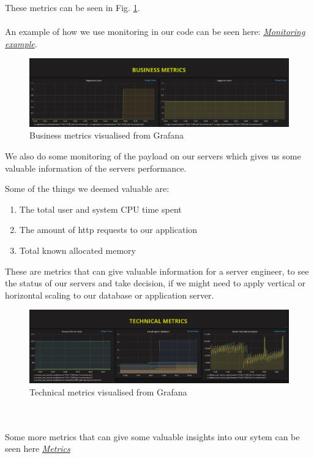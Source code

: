 \documentclass[10pt]{article}
\begin{document}
These metrics can be seen in Fig. \ref{fig:monitoring}. 
\\
\\
An example of how we use monitoring in our code can be seen here: \href{https://github.com/Arklaide/devopsITUproject/blob/main/MinitweetApi/Controllers/UsersController.cs}{\textit{Monitoring example}}.


\begin{figure}[h]
    \centering
    \includegraphics[width=\textwidth]{images/monitoringbusiness.PNG}
    \caption{Business metrics visualised from Grafana}
    \label{fig:monitoring}
\end{figure}
  
We also do some monitoring of the payload on our servers which gives us some valuable information of the servers performance.

Some of the things we deemed valuable are:
\begin{enumerate}
    \item The total user and system CPU time spent
    \item The amount of http requests to our application
    \item Total known allocated memory
\end{enumerate}

These are metrics that can give valuable information for a server engineer, to see the status of our servers and take decision, if we might need to apply vertical or horizontal scaling to our database or application server.

\begin{figure}[h]
    \centering
    \includegraphics[width=\textwidth]{images/monitoring technical.PNG}
    \caption{Technical metrics visualised from Grafana}
    \label{fig:monitoringtechnical}
\end{figure}
\\
\\
Some more metrics that can give some valuable insights into our sytem can be seen here \href{https://github.com/Arklaide/devopsITUproject/blob/main/report/sub-reports/METRICS.md}{\textit{Metrics}} 
\end{document}
